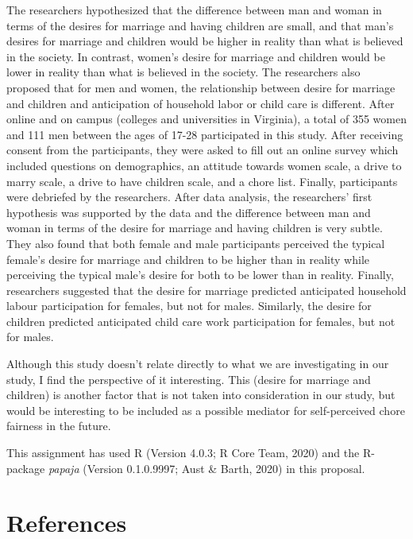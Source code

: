 \documentclass[
  english,
  man]{apa6}
\begin{document}
The researchers hypothesized that the difference between man and woman in terms of the desires for marriage and having children are small, and that man's desires for marriage and children would be higher in reality than what is believed in the society. In contrast, women's desire for marriage and children would be lower in reality than what is believed in the society. The researchers also proposed that for men and women, the relationship between desire for marriage and children and anticipation of household labor or child care is different. After online and on campus (colleges and universities in Virginia), a total of 355 women and 111 men between the ages of 17-28 participated in this study. After receiving consent from the participants, they were asked to fill out an online survey which included questions on demographics, an attitude towards women scale, a drive to marry scale, a drive to have children scale, and a chore list. Finally, participants were debriefed by the researchers. After data analysis, the researchers' first hypothesis was supported by the data and the difference between man and woman in terms of the desire for marriage and having children is very subtle. They also found that both female and male participants perceived the typical female's desire for marriage and children to be higher than in reality while perceiving the typical male's desire for both to be lower than in reality. Finally, researchers suggested that the desire for marriage predicted anticipated household labour participation for females, but not for males. Similarly, the desire for children predicted anticipated child care work participation for females, but not for males.

Although this study doesn't relate directly to what we are investigating in our study, I find the perspective of it interesting. This (desire for marriage and children) is another factor that is not taken into consideration in our study, but would be interesting to be included as a possible mediator for self-perceived chore fairness in the future.

\hfill\break
\hfill\break
This assignment has used R (Version 4.0.3; R Core Team, 2020) and the R-package \emph{papaja} (Version 0.1.0.9997; Aust \& Barth, 2020) in this proposal.

\newpage

\hypertarget{references}{%
\section{References}\label{references}}
\end{document}
